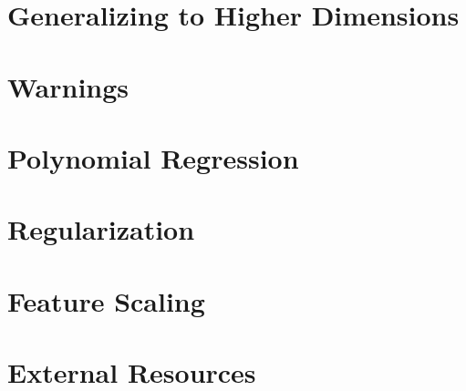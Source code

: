 \documentclass{article}
\begin{document}
\section{Generalizing to Higher Dimensions}

\section{Warnings}

\section{Polynomial Regression}

\section{Regularization}

\section{Feature Scaling}

\section{External Resources}
\end{document}
